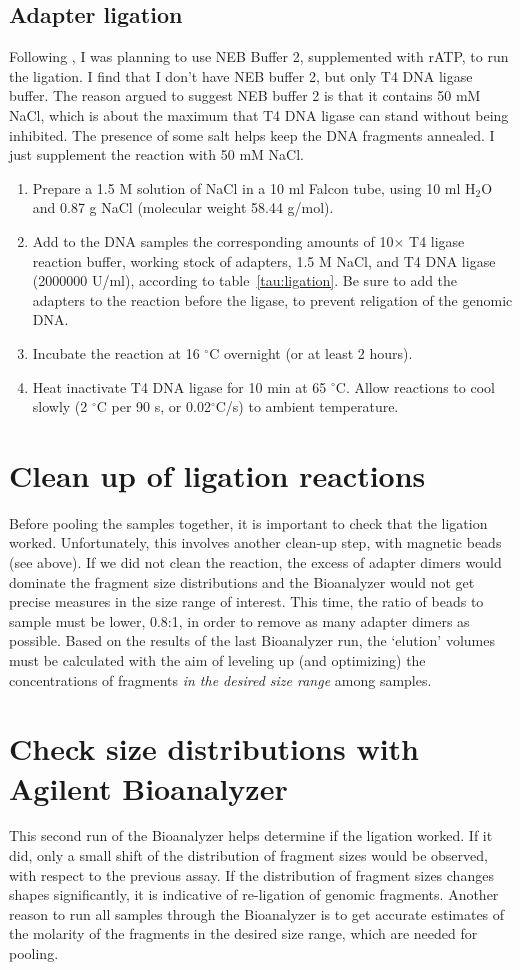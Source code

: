 \documentclass[a4paper,12pt]{article}
\begin{document}
\subsection{Adapter ligation}
Following \cite{Etter2011}, I was planning to use NEB Buffer 2, supplemented with rATP, to run the ligation. I find that I don't have NEB buffer 2, but only T4 DNA ligase buffer. The reason argued to suggest NEB buffer 2 is that it contains 50 mM NaCl, which is about the maximum that T4 DNA ligase can stand without being inhibited. The presence of some salt helps keep the DNA fragments annealed. I just supplement the reaction with 50 mM NaCl. 
\begin{enumerate}
\item Prepare a 1.5 M solution of NaCl in a 10 ml Falcon tube, using 10 ml H$_2$O and 0.87 g NaCl (molecular weight 58.44 g/mol).
\item Add to the DNA samples the corresponding amounts of 10$\times$ T4 ligase reaction buffer, working stock of adapters, 1.5 M NaCl, and T4 DNA ligase (2000000 U/ml), according to table~\ref{tau:ligation}. Be sure to add the adapters to the reaction before the ligase, to prevent religation of the genomic DNA.
\item Incubate the reaction at 16 $^{\circ}$C overnight (or at least 2 hours).
\item Heat inactivate T4 DNA ligase for 10 min at 65 $^{\circ}$C. Allow reactions to cool slowly (2 $^{\circ}$C per 90 s, or 0.02$^{\circ}$C/s) to ambient temperature.
\end{enumerate}

\section{Clean up of ligation reactions}
Before pooling the samples together, it is important to check that the ligation worked. Unfortunately, this involves another clean-up step, with magnetic beads (see above). If we did not clean the reaction, the excess of adapter dimers would dominate the fragment size distributions and the Bioanalyzer would not get precise measures in the size range of interest. This time, the ratio of beads to sample must be lower, 0.8:1, in order to remove as many adapter dimers as possible. Based on the results of the last Bioanalyzer run, the `elution' volumes must be calculated with the aim of leveling up (and optimizing) the concentrations of fragments \emph{in the desired size range} among samples.

\section{Check size distributions with Agilent Bioanalyzer}
This second run of the Bioanalyzer helps determine if the ligation worked. If it did, only a small shift of the distribution of fragment sizes would be observed, with respect to the previous assay. If the distribution of fragment sizes changes shapes significantly, it is indicative of re-ligation of genomic fragments. Another reason to run all samples through the Bioanalyzer is to get accurate estimates of the molarity of the fragments in the desired size range, which are needed for pooling.
\end{document}
